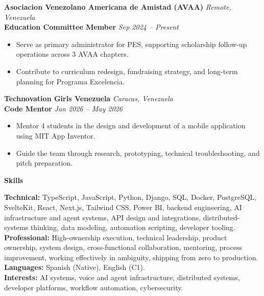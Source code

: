 \documentclass[11pt]{article}
\begin{document}
\vspace{10pt}
\textbf{Asociacion Venezolano Americana de Amistad (AVAA)} \hfill \textit{Remote, Venezuela} \\
\textbf{Education Committee Member} \hfill \textit{Sep 2024 -- Present}
\begin{itemize}
    \item Serve as primary administrator for PES, supporting scholarship follow-up operations across 3 AVAA chapters.
    \item Contribute to curriculum redesign, fundraising strategy, and long-term planning for Programa Excelencia.
\end{itemize}
\vspace{10pt}
\textbf{Technovation Girls Venezuela} \hfill \textit{Caracas, Venezuela} \\
\textbf{Code Mentor} \hfill \textit{Jan 2026 -- May 2026}
\begin{itemize}
    \item Mentor 4 students in the design and development of a mobile application using MIT App Inventor.
    \item Guide the team through research, prototyping, technical troubleshooting, and pitch preparation.
\end{itemize}
\vspace{8pt}
\begin{center}
    \textbf{Skills}
\end{center}
\vspace{-4pt}
\textbf{Technical:} TypeScript, JavaScript, Python, Django, SQL, Docker, PostgreSQL, SvelteKit, React, Next.js, Tailwind CSS, Power BI, backend engineering, AI infrastructure and agent systems, API design and integrations, distributed-systems thinking, data modeling, automation scripting, developer tooling.
\\[4pt]
\textbf{Professional:} High-ownership execution, technical leadership, product ownership, system design, cross-functional collaboration, mentoring, process improvement, working effectively in ambiguity, shipping from zero to production. \\[4pt]
\textbf{Languages:} Spanish (Native), English (C1). \\[4pt]
\textbf{Interests:} AI systems, voice and agent infrastructure, distributed systems, developer platforms, workflow automation, cybersecurity.
\end{document}
